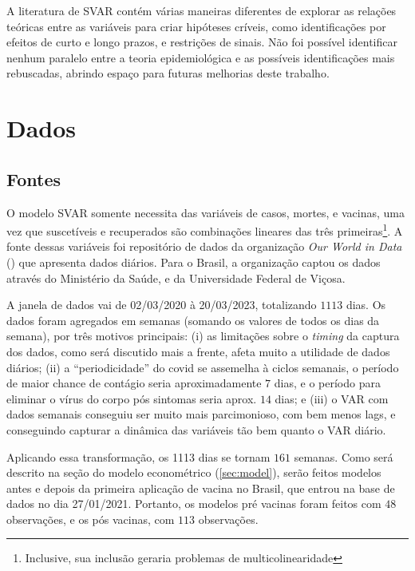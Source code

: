 \documentclass[
    article,
	12pt,				%
	oneside,			%
	a4paper,			%
	english,			%
	brazil,				%
	hyperref = {colorlinks, citecolor=c1d, linkcolor=c2d, urlcolor=c3d, colorlinks}
	]{abntex2}
\newcounter{j}
\begin{document}
A literatura de SVAR contém várias maneiras diferentes de explorar as relações teóricas entre as variáveis para criar hipóteses críveis, como identificações por efeitos de curto e longo prazos, e restrições de sinais. Não foi possível identificar nenhum paralelo entre a teoria epidemiológica e as possíveis identificações mais rebuscadas, abrindo espaço para futuras melhorias deste trabalho. 



\let\clearpage\relax
\chapter{Dados}

\section{Fontes}

O modelo SVAR somente necessita das variáveis de casos, mortes, e vacinas, uma vez que suscetíveis e recuperados são combinações lineares das três primeiras\footnote{Inclusive, sua inclusão geraria problemas de multicolinearidade}. A fonte dessas variáveis foi repositório de dados da organização \textit{Our World in Data} (\textcite{Owid}) que apresenta dados diários. Para o Brasil, a organização captou os dados através do Ministério da Saúde, e da Universidade Federal de Viçosa.

A janela de dados vai de 02/03/2020 à 20/03/2023, totalizando $1113$ dias. Os dados foram agregados em semanas (somando os valores de todos os dias da semana), por três motivos principais: (i) as limitações sobre o \textit{timing} da captura dos dados, como será discutido mais a frente, afeta muito a utilidade de dados diários; (ii) a ``periodicidade'' do covid se assemelha à ciclos semanais, o período de maior chance de contágio seria aproximadamente $7$ dias, e o período para eliminar o vírus do corpo pós sintomas seria aprox. $14$ dias; e (iii) o VAR com dados semanais conseguiu ser muito mais parcimonioso, com bem menos lags, e conseguindo capturar a dinâmica das variáveis tão bem quanto o VAR diário.

Aplicando essa transformação, os 1113 dias se tornam $161$ semanas. Como será descrito na seção do modelo econométrico (\ref{sec:model}), serão feitos modelos antes e depois da primeira aplicação de vacina no Brasil, que entrou na base de dados no dia 27/01/2021. Portanto, os modelos pré vacinas foram feitos com $48$ observações, e os pós vacinas, com $113$ observações.
\end{document}

